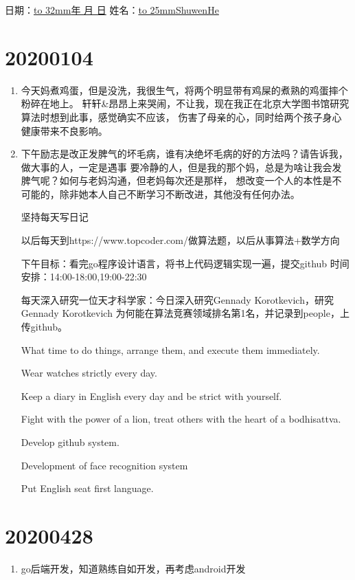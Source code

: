 \documentclass[12pt,oneside,a4paper]{ctexbook} %
\numberwithin{chapter}{part}
\begin{document}
\pagestyle{fancy}
\lfoot{}
\rfoot{}

日期：\underline{\hbox to 32mm{\renewcommand{\today}{\number\year 年 \number\month 月 \number\day 日}\today}}
\qquad 姓名：\underline{\hbox to 25mm{ShuwenHe}}

\section{20200104}
\begin{enumerate}
\item 
今天妈煮鸡蛋，但是没洗，我很生气，将两个明显带有鸡屎的煮熟的鸡蛋摔个粉碎在地上。
轩轩\&昂昂上来哭闹，不让我，现在我正在北京大学图书馆研究算法时想到此事，感觉确实不应该，
伤害了母亲的心，同时给两个孩子身心健康带来不良影响。

\item 
下午励志是改正发脾气的坏毛病，谁有决绝坏毛病的好的方法吗？请告诉我，做大事的人，一定是遇事
要冷静的人，但是我的那个妈，总是为啥让我会发脾气呢？如何与老妈沟通，但老妈每次还是那样，
想改变一个人的本性是不可能的，除非她本人自己不断学习不断改进，其他没有任何办法。

坚持每天写日记

以后每天到https://www.topcoder.com/做算法题，以后从事算法+数学方向

下午目标：看完go程序设计语言，将书上代码逻辑实现一遍，提交github
时间安排：14:00-18:00,19:00-22:30

每天深入研究一位天才科学家：今日深入研究Gennady Korotkevich，研究Gennady Korotkevich
为何能在算法竞赛领域排名第1名，并记录到people，上传github。

What time to do things, arrange them, and execute them immediately.

Wear watches strictly every day.

Keep a diary in English every day and be strict with yourself.

Fight with the power of a lion, treat others with the heart of a bodhisattva.

Develop github system.

Development of face recognition system

Put English seat first language.
\end{enumerate}

% 
\section{20200428}
\begin{enumerate}
\item 
go后端开发，知道熟练自如开发，再考虑android开发
\end{enumerate}
\end{document}
